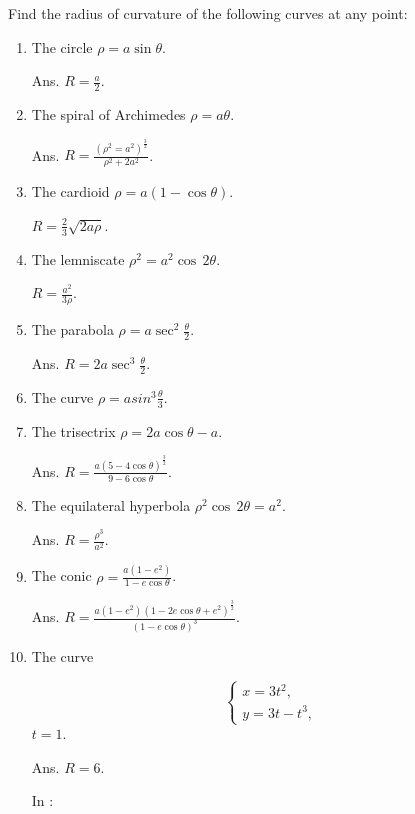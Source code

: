 Find the radius of curvature of the following curves at any point:

\begin{enumerate}
\addtocounter{enumi}{7}

\item
The circle $\rho = a\sin \theta$.

Ans. 
$R = \frac{a}{2}$.

\item
The spiral of Archimedes $\rho = a\theta$.

Ans. $R = \frac{ (\rho^2 = a^2)^{\frac{3}{2}} }{ \rho^2 + 2a^2 }$.

\item
The cardioid $\rho = a(1 − \cos\theta)$. 

$R = \frac{2}{3} \sqrt{2a\rho}$.

\item
The lemniscate $\rho^2 = a^2\cos\, 2\theta$.

$R = \frac{a^2}{3\rho}$.

\item
The parabola 
$\rho = a \sec^2 \frac{\theta}{2}$. 

Ans. $R = 2 a \sec^3 \frac{\theta}{2}$.

\item
The curve $\rho = a sin^3 \frac{\theta}{3}$.

\item
The trisectrix $\rho  = 2a\cos\theta - a$. 

Ans. $R = \frac{ a(5 - 4 \cos \theta)^{\frac{3}{2}} }{ 9 - 6 \cos \theta }$.

\item
The equilateral hyperbola $\rho^2\cos\, 2\theta = a^2$. 

Ans. $R = \frac{\rho^3}{a^2}$.

\item
The conic 
$\rho = \frac{a(1 - e^2)}{1 - e \cos \theta}$. 	

Ans. 
$R = \frac{a(1 - e^2)(1 - 2e \cos \theta + e^2)^{\frac{3}{2}}}{(1 
- e \cos \theta)^3}$.

\item
The curve 	

\[
\begin{cases}
x = 3 t^2, \\ 
y = 3 t - t^3,
\end{cases}
\]
$t = 1$.

Ans. $R = 6$.


In \sage:


\end{enumerate}
